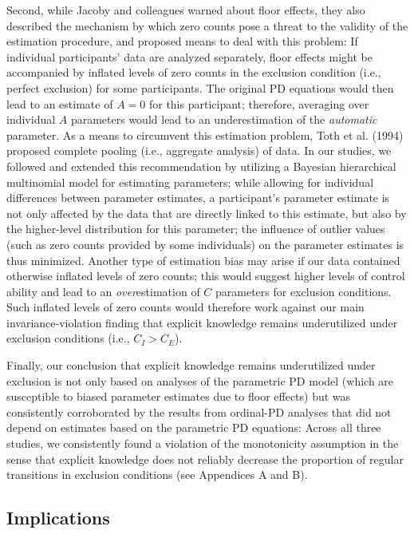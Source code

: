 \documentclass[floatsintext,doc]{apa6}
\theoremstyle{definition}
\theoremstyle{definition}
\theoremstyle{definition}
\theoremstyle{remark}
\begin{document}
Second, while Jacoby and colleagues warned about floor effects, they
also described the mechanism by which zero counts pose a threat to the
validity of the estimation procedure, and proposed means to deal with
this problem: If individual participants' data are analyzed separately,
floor effects might be accompanied by inflated levels of zero counts in
the exclusion condition (i.e., perfect exclusion) for some participants.
The original PD equations would then lead to an estimate of \(A=0\) for
this participant; therefore, averaging over individual \(A\) parameters
would lead to an underestimation of the \emph{automatic} parameter. As a
means to circumvent this estimation problem, Toth et al. (1994) proposed
complete pooling (i.e., aggregate analysis) of data. In our studies, we
followed and extended this recommendation by utilizing a Bayesian
hierarchical multinomial model for estimating parameters; while allowing
for individual differences between parameter estimates, a participant's
parameter estimate is not only affected by the data that are directly
linked to this estimate, but also by the higher-level distribution for
this parameter; the influence of outlier values (such as zero counts
provided by some individuals) on the parameter estimates is thus
minimized. Another type of estimation bias may arise if our data
contained otherwise inflated levels of zero counts; this would suggest
higher levels of control ability and lead to an \emph{over}estimation of
\(C\) parameters for exclusion conditions. Such inflated levels of zero
counts would therefore work against our main invariance-violation
finding that explicit knowledge remains underutilized under exclusion
conditions (i.e., \(C_I > C_E\)).

Finally, our conclusion that explicit knowledge remains underutilized
under exclusion is not only based on analyses of the parametric PD model
(which are susceptible to biased parameter estimates due to floor
effects) but was consistently corroborated by the results from
ordinal-PD analyses that did not depend on estimates based on the
parametric PD equations: Across all three studies, we consistently found
a violation of the monotonicity assumption in the sense that explicit
knowledge does not reliably decrease the proportion of regular
transitions in exclusion conditions (see Appendices A and B).

\subsection{Implications}\label{implications}
\end{document}

